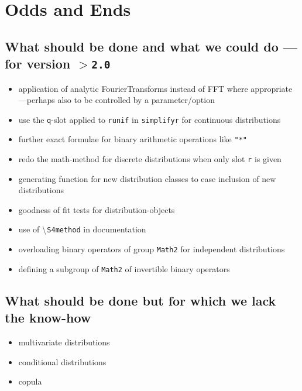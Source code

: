 \documentclass[11pt]{article}
\newcommand{\code}[1]{{\tt #1}}
\newcommand{\pkgversion}{{\tt 2.0}}
\begin{document}
\section{Odds and Ends}
\subsection[What should be done and what we could do]%
{What should be done and what we could do ---for version $>$\pkgversion}
\begin{itemize}
\item application of analytic FourierTransforms instead of FFT where
appropriate ---perhaps also to be controlled
by a parameter/option
\item use the \code{q}-slot applied to \code{runif} in \code{simplifyr} 
for continuous distributions
\item further exact formulae for binary arithmetic operations like \code{"*"}
\item redo the math-method for discrete distributions when only slot \code{r} %
is given
\item generating function for new distribution classes to ease inclusion of 
new distributions
\item goodness of fit tests for distribution-objects
\item use of $\tt \backslash$\code{S4method} in documentation
\item overloading binary operators of group \code{Math2} for independent 
distributions
\item defining a subgroup of \code{Math2} of invertible binary operators
\end{itemize}
\subsection{What should be done but for which we lack the know-how}
\begin{itemize}
  \item multivariate distributions
  \item conditional distributions
  \item copula
\end{itemize}
%
\end{document}
